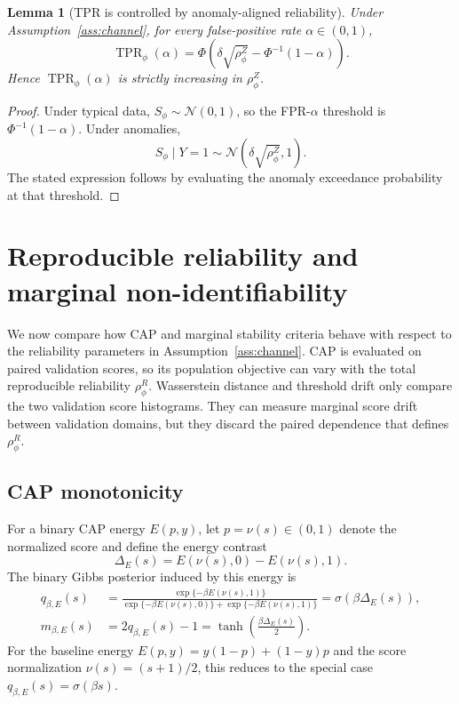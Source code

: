 \documentclass[11pt]{article}
\newtheorem{lemma}{Lemma}
\newcommand{\Normal}{\mathcal{N}}
\newcommand{\TPR}{\operatorname{TPR}}
\begin{document}
\begin{lemma}[TPR is controlled by anomaly-aligned reliability]
\label{lem:tpr-rhoz}
Under Assumption~\ref{ass:channel}, for every false-positive rate
\(\alpha\in(0,1)\),
\[
    \TPR_\phi(\alpha)
    =
    \Phi\!\left(
        \delta\sqrt{\rho_\phi^Z}-\Phi^{-1}(1-\alpha)
    \right).
\]
Hence \(\TPR_\phi(\alpha)\) is strictly increasing in
\(\rho_\phi^Z\).
\end{lemma}

\begin{proof}
Under typical data, \(S_\phi\sim\Normal(0,1)\), so the FPR-\(\alpha\)
threshold is \(\Phi^{-1}(1-\alpha)\). Under anomalies,
\[
    S_\phi\mid Y=1
    \sim
    \Normal(\delta\sqrt{\rho_\phi^Z},1).
\]
The stated expression follows by evaluating the anomaly exceedance probability
at that threshold.
\end{proof}

\section{Reproducible reliability and marginal non-identifiability}

We now compare how CAP and marginal stability criteria behave with respect to
the reliability parameters in Assumption~\ref{ass:channel}. CAP is evaluated on
paired validation scores, so its population objective can vary with the total
reproducible reliability \(\rho_\phi^R\). Wasserstein distance and threshold
drift only compare the two validation score histograms. They can measure
marginal score drift between validation domains, but they discard the paired
dependence that defines \(\rho_\phi^R\).

\subsection{CAP monotonicity}

For a binary CAP energy \(E(p,y)\), let \(p=\nu(s)\in(0,1)\) denote the
normalized score and define the energy contrast
\[
    \Delta_E(s)
    =
    E(\nu(s),0)-E(\nu(s),1).
\]
The binary Gibbs posterior induced by this energy is
\[
\begin{aligned}
    q_{\beta,E}(s)
    &=
    \frac{\exp\{-\beta E(\nu(s),1)\}}
    {\exp\{-\beta E(\nu(s),0)\}+\exp\{-\beta E(\nu(s),1)\}}
    =
    \sigma(\beta\Delta_E(s)),\\
    m_{\beta,E}(s)
    &=
    2q_{\beta,E}(s)-1
    =
    \tanh\!\left(\frac{\beta\Delta_E(s)}{2}\right).
\end{aligned}
\]
For the baseline energy \(E(p,y)=y(1-p)+(1-y)p\) and the score normalization
\(\nu(s)=(s+1)/2\), this reduces to the special case
\(q_{\beta,E}(s)=\sigma(\beta s)\).
\end{document}
